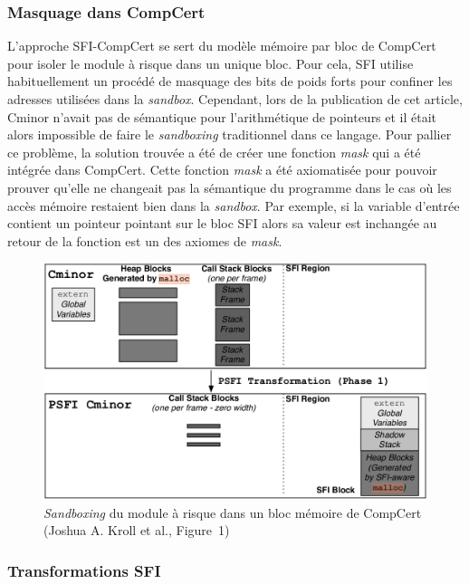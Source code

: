 \documentclass[11pt]{sdm}
\begin{document}
\subsubsection{Masquage dans CompCert}

L'approche SFI-CompCert se sert du modèle mémoire par bloc de CompCert pour isoler le module à risque dans un unique bloc. Pour cela, SFI utilise habituellement un procédé de masquage des bits de poids forts pour confiner les adresses utilisées dans la \textit{sandbox}. Cependant, lors de la publication de cet article, Cminor n'avait pas de sémantique pour l'arithmétique de pointeurs et il était alors impossible de faire le \textit{sandboxing} traditionnel dans ce langage. Pour pallier ce problème, la solution trouvée a été de créer une fonction \textit{mask} qui a été intégrée dans CompCert. Cette fonction \textit{mask} a été axiomatisée pour pouvoir prouver qu'elle ne changeait pas la sémantique du programme dans le cas où les accès mémoire restaient bien dans la \textit{sandbox}. Par exemple, \og si la variable d'entrée contient un pointeur pointant sur le bloc SFI alors sa valeur est inchangée au retour de la fonction\fg{} est un des axiomes de \textit{mask}.

\begin{figure}
\centering
\includegraphics[scale=0.36]{images/psfi.png}
\caption{\textit{Sandboxing} du module à risque dans un bloc mémoire de CompCert (Joshua A. Kroll et al., Figure~1)}
\label{psfi}
\end{figure}

\subsubsection{Transformations SFI}
\end{document}
